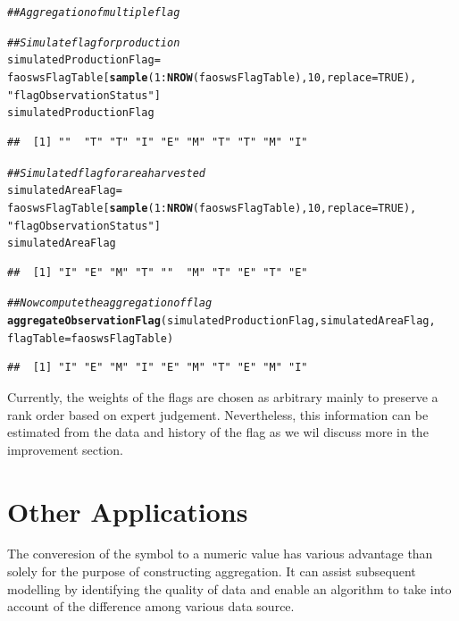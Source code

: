 \documentclass[nojss]{jss}\usepackage[]{graphicx}\usepackage[]{color}
\makeatletter
\newcommand{\hlnum}[1]{\textcolor[rgb]{0.686,0.059,0.569}{#1}}%
\newcommand{\hlstr}[1]{\textcolor[rgb]{0.192,0.494,0.8}{#1}}%
\newcommand{\hlcom}[1]{\textcolor[rgb]{0.678,0.584,0.686}{\textit{#1}}}%
\newcommand{\hlopt}[1]{\textcolor[rgb]{0,0,0}{#1}}%
\newcommand{\hlstd}[1]{\textcolor[rgb]{0.345,0.345,0.345}{#1}}%
\newcommand{\hlkwb}[1]{\textcolor[rgb]{0.69,0.353,0.396}{#1}}%
\newcommand{\hlkwc}[1]{\textcolor[rgb]{0.333,0.667,0.333}{#1}}%
\newcommand{\hlkwd}[1]{\textcolor[rgb]{0.737,0.353,0.396}{\textbf{#1}}}%
\newenvironment{kframe}{%
 \def\at@end@of@kframe{}%
 \ifinner\ifhmode%
  \def\at@end@of@kframe{\end{minipage}}%
  \begin{minipage}{\columnwidth}%
 \fi\fi%
 \def\FrameCommand##1{\hskip\@totalleftmargin \hskip-\fboxsep
 \colorbox{shadecolor}{##1}\hskip-\fboxsep
     \hskip-\linewidth \hskip-\@totalleftmargin \hskip\columnwidth}%
 \MakeFramed {\advance\hsize-\width
   \@totalleftmargin\z@ \linewidth\hsize
   \@setminipage}}%
 {\par\unskip\endMakeFramed%
 \at@end@of@kframe}
\newenvironment{knitrout}{}{} %
\makeatother
\begin{document}
\begin{knitrout}
\color{fgcolor}\begin{kframe}
\begin{alltt}
\hlcom{## Aggregation of multiple flag}

\hlcom{## Simulate flag for production}
\hlstd{simulatedProductionFlag} \hlkwb{=}
    \hlstd{faoswsFlagTable[}\hlkwd{sample}\hlstd{(}\hlnum{1}\hlopt{:}\hlkwd{NROW}\hlstd{(faoswsFlagTable),} \hlnum{10}\hlstd{,} \hlkwc{replace} \hlstd{=} \hlnum{TRUE}\hlstd{),}
                    \hlstr{"flagObservationStatus"}\hlstd{]}
\hlstd{simulatedProductionFlag}
\end{alltt}
\begin{verbatim}
##  [1] ""  "T" "T" "I" "E" "M" "T" "T" "M" "I"
\end{verbatim}
\begin{alltt}
\hlcom{## Simulated flag for area harvested}
\hlstd{simulatedAreaFlag} \hlkwb{=}
    \hlstd{faoswsFlagTable[}\hlkwd{sample}\hlstd{(}\hlnum{1}\hlopt{:}\hlkwd{NROW}\hlstd{(faoswsFlagTable),} \hlnum{10}\hlstd{,} \hlkwc{replace} \hlstd{=} \hlnum{TRUE}\hlstd{),}
                    \hlstr{"flagObservationStatus"}\hlstd{]}
\hlstd{simulatedAreaFlag}
\end{alltt}
\begin{verbatim}
##  [1] "I" "E" "M" "T" ""  "M" "T" "E" "T" "E"
\end{verbatim}
\begin{alltt}
\hlcom{## Now compute the aggregation of flag}
\hlkwd{aggregateObservationFlag}\hlstd{(simulatedProductionFlag, simulatedAreaFlag,}
                         \hlkwc{flagTable} \hlstd{= faoswsFlagTable)}
\end{alltt}
\begin{verbatim}
##  [1] "I" "E" "M" "I" "E" "M" "T" "E" "M" "I"
\end{verbatim}
\end{kframe}
\end{knitrout}


Currently, the weights of the flags are chosen as arbitrary mainly to
preserve a rank order based on expert judgement. Nevertheless, this
information can be estimated from the data and history of the flag as
we wil discuss more in the improvement section.



\section{Other Applications}
The converesion of the symbol to a numeric value has various advantage
than solely for the purpose of constructing aggregation. It can assist
subsequent modelling by identifying the quality of data and enable an
algorithm to take into account of the difference among various data
source.
\end{document}
